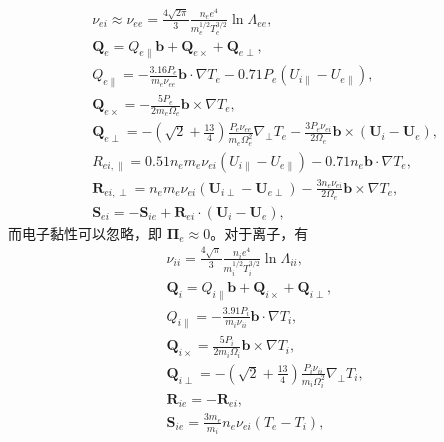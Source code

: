 \begin{align}
&\nu_{ei}\approx\nu_{ee}=\frac{4\sqrt{2\pi}}3
 \frac{n_ee^4}{m_e^{1/2}T_e^{3/2}}\ln\Lambda_{ee},
 \tag{L7-51a}\label{eq:L7:51a}\\
&\boldsymbol Q_e=Q_{e\parallel}\boldsymbol b+\boldsymbol Q_{e\times}+\boldsymbol Q_{e\perp},
 \tag{L7-51b}\label{eq:L7:51b}\\
&Q_{e\parallel}=-\frac{3.16P_e}{m_e\nu_{ee}}\boldsymbol b\cdot\nabla T_e
 -0.71P_e(U_{i\parallel}-U_{e\parallel}),
 \tag{L7-51c}\label{eq:L7:51c}\\
&\boldsymbol Q_{e\times}=-\frac{5P_e}{2m_e\Omega_e}\boldsymbol b\times\nabla T_e,
 \tag{L7-51d}\label{eq:L7:51d}\\
&\boldsymbol Q_{e\perp}=-\left(\sqrt2+\frac{13}4\right)
 \frac{P_e\nu_{ee}}{m_e\Omega_e^2}\nabla_\perp T_e
 -\frac{3P_e\nu_{ei}}{2\Omega_e}\boldsymbol b\times(\boldsymbol U_i-\boldsymbol U_e),
 \tag{L7-51e}\label{eq:L7:51e}\\
&R_{ei,\parallel}=0.51n_em_e\nu_{ei}(U_{i\parallel}-U_{e\parallel})
 -0.71n_e\boldsymbol b\cdot\nabla T_e,
 \tag{L7-51f}\label{eq:L7:51f}\\
&\boldsymbol R_{ei,\perp}=n_em_e\nu_{ei}(\boldsymbol U_{i\perp}-\boldsymbol U_{e\perp})
 -\frac{3n_e\nu_{ei}}{2\Omega_e}\boldsymbol b\times\nabla T_e,
 \tag{L7-51g}\label{eq:L7:51g}\\
&\boldsymbol S_{ei}=-\boldsymbol S_{ie}+\boldsymbol R_{ei}\cdot(\boldsymbol U_i-\boldsymbol U_e),
 \tag{L7-51h}\label{eq:L7:51h}
\end{align}
而电子黏性可以忽略，即 $\boldsymbol\Pi_e\approx0$。对于离子，有
\begin{align}
&\nu_{ii}=\frac{4\sqrt\pi}3\frac{n_ie^4}{m_i^{1/2}T_i^{3/2}}\ln\Lambda_{ii},
 \tag{L7-52a}\label{eq:L7:52a}\\
&\boldsymbol Q_i=Q_{i\parallel}\boldsymbol b+\boldsymbol Q_{i\times}+\boldsymbol Q_{i\perp},
 \tag{L7-52b}\label{eq:L7:52b}\\
&Q_{i\parallel}=-\frac{3.91P_i}{m_i\nu_{ii}}\boldsymbol b\cdot\nabla T_i,
 \tag{L7-52c}\label{eq:L7:52c}\\
&\boldsymbol Q_{i\times}=\frac{5P_i}{2m_i\Omega_i}\boldsymbol b\times\nabla T_i,
 \tag{L7-52d}\label{eq:L7:52d}\\
&\boldsymbol Q_{i\perp}=-\left(\sqrt2+\frac{13}4\right)
 \frac{P_i\nu_{ii}}{m_i\Omega_i^2}\nabla_\perp T_i,
 \tag{L7-52e}\label{eq:L7:52e}\\
&\boldsymbol R_{ie}=-\boldsymbol R_{ei},
 \tag{L7-52f}\label{eq:L7:52f}\\
&\boldsymbol S_{ie}=\frac{3m_e}{m_i}n_e\nu_{ei}(T_e-T_i),
 \tag{L7-52g}\label{eq:L7:52g}
\end{align}
